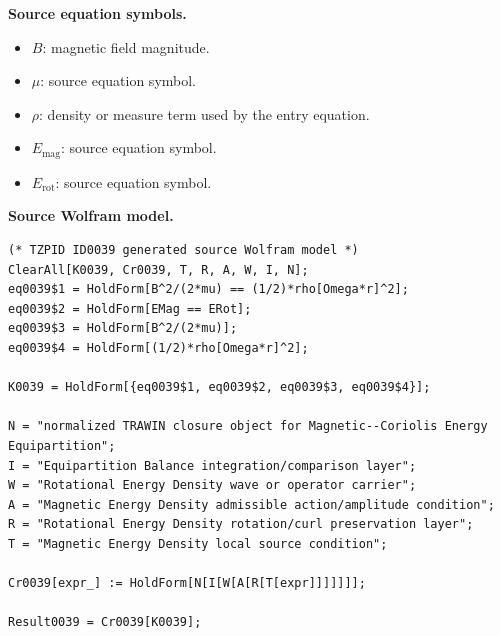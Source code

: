\begin{minipage}[t]{0.49\linewidth}
\begingroup
\small
\raggedright
\textbf{Source equation symbols.}\par
\begin{itemize}[leftmargin=1.35em,itemsep=1pt,topsep=1pt,parsep=0pt]
    \item $B$: magnetic field magnitude.
    \item $\mu$: source equation symbol.
    \item $\rho$: density or measure term used by the entry equation.
    \item $E_{\mathrm{mag}}$: source equation symbol.
    \item $E_{\mathrm{rot}}$: source equation symbol.
\end{itemize}
\endgroup
\end{minipage}\hfill
\begin{minipage}[t]{0.47\linewidth}
\begingroup
\scriptsize
\raggedright
\textbf{Source Wolfram model.}\par
\begin{Verbatim}[fontsize=\tiny,breaklines=true,breakanywhere=true]
(* TZPID ID0039 generated source Wolfram model *)
ClearAll[K0039, Cr0039, T, R, A, W, I, N];
eq0039$1 = HoldForm[B^2/(2*mu) == (1/2)*rho[Omega*r]^2];
eq0039$2 = HoldForm[EMag == ERot];
eq0039$3 = HoldForm[B^2/(2*mu)];
eq0039$4 = HoldForm[(1/2)*rho[Omega*r]^2];

K0039 = HoldForm[{eq0039$1, eq0039$2, eq0039$3, eq0039$4}];

N = "normalized TRAWIN closure object for Magnetic--Coriolis Energy Equipartition";
I = "Equipartition Balance integration/comparison layer";
W = "Rotational Energy Density wave or operator carrier";
A = "Magnetic Energy Density admissible action/amplitude condition";
R = "Rotational Energy Density rotation/curl preservation layer";
T = "Magnetic Energy Density local source condition";

Cr0039[expr_] := HoldForm[N[I[W[A[R[T[expr]]]]]]];

Result0039 = Cr0039[K0039];
\end{Verbatim}
\endgroup
\end{minipage}

